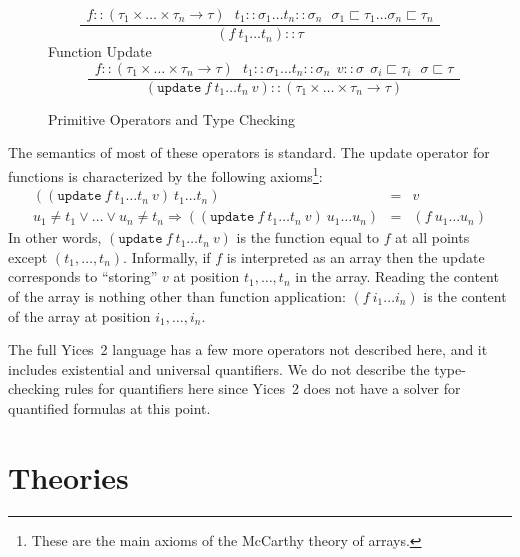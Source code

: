 \documentclass[11pt,twoside,fleqn,openright,titlepage]{cslreport}
\begin{document}
\begin{figure}
\begin{center}
\begin{displaymath}
\frac{~~f::(\tau_1\times\ldots\times\tau_n\rightarrow\tau)~~~t_1::\sigma_1\ldots t_n::\sigma_n~~~\sigma_1\sqsubset\tau_1\ldots\sigma_n\sqsubset\tau_n~~}{~~~(f\ t_1\ldots t_n)::\tau~~~}
\end{displaymath}
\vspace*{2ex}
Function Update\\[1ex]
\begin{displaymath}
\hspace{2em}
\frac{~~f::(\tau_1\times\ldots\times\tau_n\rightarrow\tau)~~~t_1::\sigma_1\ldots t_n::\sigma_n~~v::\sigma~~\sigma_i\sqsubset\tau_i~~~\sigma\sqsubset\tau~~}{~~~(\mathtt{update}\ f\ t_1\ldots t_n\ v)::(\tau_1\times\ldots\times\tau_n\rightarrow\tau)~~~}
\end{displaymath}
\vspace*{2ex}
\end{center}
\caption{Primitive Operators and Type Checking}
\label{type-checking}
\end{figure}

\medskip\noindent
The semantics of most of these operators is standard. The update
operator for functions is characterized by the following
axioms\footnote{These are the main axioms of the McCarthy theory of
  arrays.}:
\begin{eqnarray*}
((\mathtt{update}\ f\ t_1\ldots t_n\ v)\ t_1\ldots t_n) & = & v \\
u_1\neq t_1\vee\ldots\vee u_n\neq t_n\Rightarrow((\mathtt{update}\ f\ t_1\ldots t_n\ v)\ u_1\ldots u_n) & = & (f\ u_1\ldots u_n)
\end{eqnarray*}
In  other  words, $(\mathtt{update}\  f\  t_1\ldots  t_n\  v)$ is  the
function  equal  to  $f$  at  all  points  except  $(t_1,\ldots,t_n)$.
Informally,  if  $f$  is  interpreted  as an  array  then  the  update
corresponds  to ``storing''  $v$ at  position $t_1,\ldots,t_n$  in the
array.   Reading  the content  of  the  array  is nothing  other  than
function application: $(f\ i_1\ldots i_n)$ is the content of the array
at position $i_1,\ldots, i_n$.

\medskip\noindent
The full Yices~2 language has a few more operators not described here,
and  it includes  existential  and universal  quantifiers.  We do  not
describe the  type-checking rules  for quantifiers here  since Yices~2
does not have a solver for quantified formulas at this point.


\section{Theories}
\end{document}
